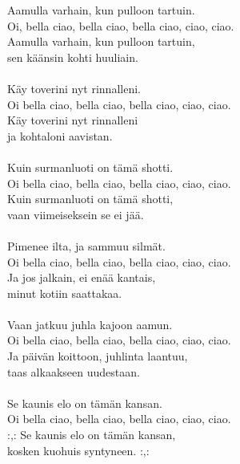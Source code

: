 
Aamulla varhain, kun pulloon tartuin. \\ Oi, bella ciao, bella ciao, bella ciao, ciao, ciao. \\ Aamulla varhain, kun pulloon tartuin, \\ sen käänsin kohti huuliain. \\  \hspace{10mm} \\ Käy toverini nyt rinnalleni. \\ Oi bella ciao, bella ciao, bella ciao, ciao, ciao. \\ Käy toverini nyt rinnalleni \\ ja kohtaloni aavistan. \\  \hspace{10mm} \\ Kuin surmanluoti on tämä shotti. \\ Oi bella ciao, bella ciao, bella ciao, ciao, ciao. \\ Kuin surmanluoti on tämä shotti, \\ vaan viimeiseksein se ei jää. \\  \hspace{10mm} \\ Pimenee ilta, ja sammuu silmät. \\ Oi bella ciao, bella ciao, bella ciao, ciao, ciao. \\ Ja jos jalkain, ei enää kantais, \\ minut kotiin saattakaa. \\ \hspace{10mm}  \\ Vaan jatkuu juhla kajoon aamun. \\ Oi bella ciao, bella ciao, bella ciao, ciao, ciao. \\ Ja päivän koittoon, juhlinta laantuu, \\ taas alkaakseen uudestaan. \\ \hspace{10mm}  \\ Se kaunis elo on tämän kansan. \\ Oi bella ciao, bella ciao, bella ciao, ciao, ciao. \\ :,: Se kaunis elo on tämän kansan, \\ kosken kuohuis syntyneen. :,: 